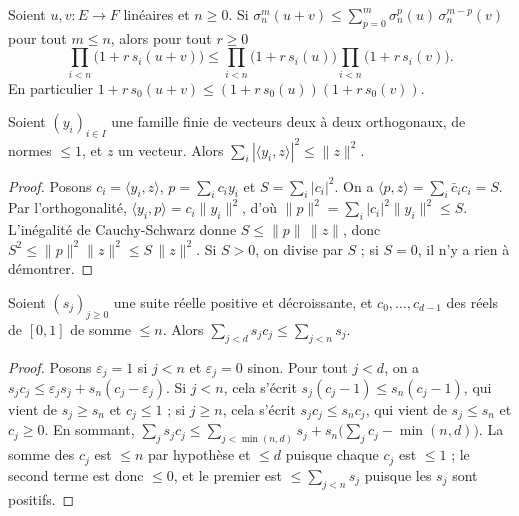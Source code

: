 \begin{enonce}
Soient $u, v : E \to F$ linéaires et $n \geq 0$. Si $\sigma_n^m(u+v) \leq \sum_{p=0}^{m} \sigma_n^p(u)\,\sigma_n^{m-p}(v)$ pour tout $m \leq n$, alors pour tout $r \geq 0$
\[
  \prod_{i < n} \bigl(1 + r\,s_i(u+v)\bigr) \leq \prod_{i < n} \bigl(1 + r\,s_i(u)\bigr) \prod_{i < n} \bigl(1 + r\,s_i(v)\bigr).
\]
En particulier $1 + r\,s_0(u+v) \leq (1 + r\,s_0(u))(1 + r\,s_0(v))$.
\end{enonce}

\begin{lemme}\label{lem:1-bessel}
Soient $(y_i)_{i \in I}$ une famille finie de vecteurs deux à deux orthogonaux, de normes $\leq 1$, et $z$ un vecteur. Alors $\sum_i |\langle y_i, z\rangle|^2 \leq \|z\|^2$.
\end{lemme}

\begin{proof}
Posons $c_i = \langle y_i, z\rangle$, $p = \sum_i c_i y_i$ et $S = \sum_i |c_i|^2$. On a $\langle p, z\rangle = \sum_i \bar c_i c_i = S$. Par l'orthogonalité, $\langle y_i, p\rangle = c_i \|y_i\|^2$, d'où $\|p\|^2 = \sum_i |c_i|^2 \|y_i\|^2 \leq S$. L'inégalité de Cauchy-Schwarz donne $S \leq \|p\|\,\|z\|$, donc $S^2 \leq \|p\|^2 \|z\|^2 \leq S\,\|z\|^2$. Si $S > 0$, on divise par $S$ ; si $S = 0$, il n'y a rien à démontrer.
\end{proof}

\begin{lemme}\label{lem:1-poids}
Soient $(s_j)_{j \geq 0}$ une suite réelle positive et décroissante, et $c_0, \ldots, c_{d-1}$ des réels de $[0,1]$ de somme $\leq n$. Alors $\sum_{j < d} s_j c_j \leq \sum_{j < n} s_j$.
\end{lemme}

\begin{proof}
Posons $\varepsilon_j = 1$ si $j < n$ et $\varepsilon_j = 0$ sinon. Pour tout $j < d$, on a $s_j c_j \leq \varepsilon_j s_j + s_n(c_j - \varepsilon_j)$. Si $j < n$, cela s'écrit $s_j(c_j - 1) \leq s_n(c_j - 1)$, qui vient de $s_j \geq s_n$ et $c_j \leq 1$ ; si $j \geq n$, cela s'écrit $s_j c_j \leq s_n c_j$, qui vient de $s_j \leq s_n$ et $c_j \geq 0$. En sommant, $\sum_j s_j c_j \leq \sum_{j < \min(n,d)} s_j + s_n\bigl(\sum_j c_j - \min(n,d)\bigr)$. La somme des $c_j$ est $\leq n$ par hypothèse et $\leq d$ puisque chaque $c_j$ est $\leq 1$ ; le second terme est donc $\leq 0$, et le premier est $\leq \sum_{j<n} s_j$ puisque les $s_j$ sont positifs.
\end{proof}

